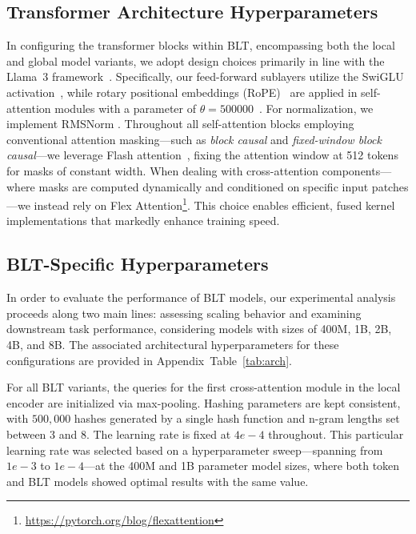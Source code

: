 \subsection{Transformer Architecture Hyperparameters} In configuring the transformer blocks within {\textsc BLT}, encompassing both the local and global model variants, we adopt design choices primarily in line with the Llama~3 framework~\citep{dubey2024llama}. Specifically, our feed-forward sublayers utilize the SwiGLU activation~\citep{swiglu}, while rotary positional embeddings (RoPE)~\citep{RoPe} are applied in self-attention modules with a parameter of $\theta=500000$~\citep{xiong2024effective}. For normalization, we implement RMSNorm \citep{RMSNorm}. Throughout all self-attention blocks employing conventional attention masking—such as \textit{block causal} and \textit{fixed-window block causal}—we leverage Flash attention~\citep{dao2022flashattention}, fixing the attention window at 512 tokens for masks of constant width. When dealing with cross-attention components—where masks are computed dynamically and conditioned on specific input patches—we instead rely on Flex Attention\footnote{\url{https://pytorch.org/blog/flexattention}}. This choice enables efficient, fused kernel implementations that markedly enhance training speed.

\subsection{{\textsc BLT}-Specific Hyperparameters}

In order to evaluate the performance of {\textsc BLT} models, our experimental analysis proceeds along two main lines: assessing scaling behavior and examining downstream task performance, considering models with sizes of 400M, 1B, 2B, 4B, and 8B. The associated architectural hyperparameters for these configurations are provided in Appendix~Table~\ref{tab:arch}.

For all {\textsc BLT} variants, the queries for the first cross-attention module in the local encoder are initialized via max-pooling. Hashing parameters are kept consistent, with $500,000$ hashes generated by a single hash function and n-gram lengths set between 3 and 8. The learning rate is fixed at $4e-4$ throughout. This particular learning rate was selected based on a hyperparameter sweep—spanning from $1e-3$ to $1e-4$—at the 400M and 1B parameter model sizes, where both token and {\textsc BLT} models showed optimal results with the same value.

